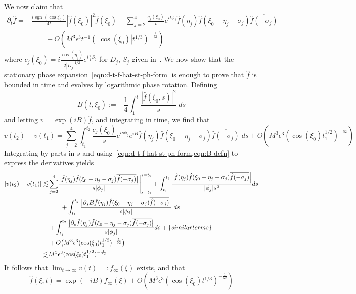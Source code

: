 \documentclass[letterpaper, reqno,final]{amsart}
\DeclareMathOperator{\sgn}{sgn}
\newcommand{\stPhErr}{{\frac{1}{52}}}
\newcommand{\btext}[1]{\left\{\textup{#1}\right\}}
\newcommand{\bsim}{\btext{similar terms}}
\begin{document}
We now claim that
\begin{equation}\label{eqn:d-t-f-hat-st-ph-form}\begin{split}
    \partial_t \hat{f} =& \frac{i\sgn(\cos \xi_0)}{4t} |\hat{f}(\xi_0)|^2 \hat{f}(\xi_0) + \sum_{j=2}^4 \frac{c_j(\xi_0)}{t} e^{it\phi_j} \hat{f}(\eta_j) \hat{f}(\xi_0 - \eta_j - \sigma_j) \overline{\hat{f}(-\sigma_j)}\\
    &\qquad+ O\left(M^3\epsilon^3 t^{-1}(|\cos(\xi_0)| t^{1/3})^{-\stPhErr}\right)
\end{split}\end{equation}
where $c_j(\xi_0) = i \frac{\cos(\eta_j)}{2|D_j|^{1/2}}e^{i\frac{\pi}{4}S_j}$ for $D_j$, $S_j$ given in~.  We now show that the stationary phase expansion~\eqref{eqn:d-t-f-hat-st-ph-form} is enough to prove that $\hat{f}$ is bounded in time and evolves by logarithmic phase rotation.  Defining
\begin{equation}\label{eqn:B-defn}
    B(t,\xi_0) := -\frac{1}{4} \int_{1}^t \frac{|\hat f(\xi_0,s)|^2}{s}\;ds
\end{equation}
and letting $v = \exp(iB)\hat{f}$, and integrating in time, we find that
\begin{equation*}
    v(t_2) - v(t_1) = \sum_{j=2}^4 \int_{t_1}^{t_2} \frac{c_j(\xi_0)}{s} e^{is\phi_j} e^{iB} \hat{f}(\eta_j) \hat{f}(\xi_0 - \eta_j - \sigma_j) \overline{\hat{f}(-\sigma_j)} \;ds  + O\left(M^3\epsilon^3 (\cos(\xi_0) t_1^{1/2})^{-\stPhErr}\right)
\end{equation*}
Integrating by parts in $s$ and using~\cref{eqn:d-t-f-hat-st-ph-form,eqn:B-defn} to express the derivatives yields
\begin{equation*}\begin{split}
    |v(t_2) - v(t_1)| \lesssim& \sum_{j=2}^4\Biggl. \frac{\bigl| \hat{f}(\eta_j) \hat{f}(\xi_0 - \eta_j - \sigma_j) \overline{\hat{f}(-\sigma_j)} \bigr|}{s|\phi_j|} \Biggr|_{s = t_1}^{s = t_2}+ \int_{t_1}^{t_2} \frac{\left| \hat{f}(\eta_j) \hat{f}(\xi_0 - \eta_j - \sigma_j) \overline{\hat{f}(-\sigma_j)} \right|}{|\phi_j|s^2}  ds\\
    &\qquad+ \int_{t_1}^{t_2} \frac{\bigl|\partial_s B \hat{f}(\eta_j) \hat{f}(\xi_0 - \eta_j - \sigma_j) \overline{\hat{f}(-\sigma_j)} \bigr|}{s |\phi_j|}   \; ds \\
    &+ \int_{t_1}^{t_2} \frac{\bigl| \partial_s \hat{f}(\eta_j) \hat{f}(\xi_0 - \eta_j - \sigma_j) \overline{\hat{f}(-\sigma_j)} \bigr|}{s |\phi_j|} ds +\bsim \\
    &+ O\bigl(M^3\epsilon^3 (\cos(\xi_0) t_1^{1/2})^{-\stPhErr}\bigr)\\
    \lesssim& M^3\epsilon^3 (\cos(\xi_0) t_1^{1/2})^{-\stPhErr}
\end{split}\end{equation*}
It follows that $\lim_{t \to \infty} v(t) =: f_\infty(\xi)$ exists, and that
\begin{equation*}
    \hat{f}(\xi,t) = \exp(-iB) f_{\infty}(\xi) + O\left(M^3\epsilon^3 (\cos(\xi_0) t^{1/3})^{-\stPhErr}\right)
\end{equation*}
\end{document}
